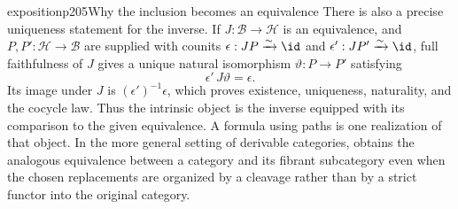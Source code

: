 \begin{dcomment}{exposition}{p205}{Why the inclusion becomes an equivalence}
There is also a precise uniqueness statement for the inverse. If $J:\mathcal B\to\mathcal H$ is an equivalence, and $P,P':\mathcal H\to\mathcal B$ are supplied with counits $\epsilon:JP\xrightarrow{\sim}\id$ and $\epsilon':JP'\xrightarrow{\sim}\id$, full faithfulness of $J$ gives a unique natural isomorphism $\vartheta:P\to P'$ satisfying
\[
 \epsilon'\,J\vartheta=\epsilon.
\]
Its image under $J$ is $(\epsilon')^{-1}\epsilon$, which proves existence, uniqueness, naturality, and the cocycle law. Thus the intrinsic object is the inverse equipped with its comparison to the given equivalence. A formula using paths is one realization of that object. In the more general setting of derivable categories, \citet[Proposition~1.8]{Cisinski2010} obtains the analogous equivalence between a category and its fibrant subcategory even when the chosen replacements are organized by a cleavage rather than by a strict functor into the original category.
\end{dcomment}

